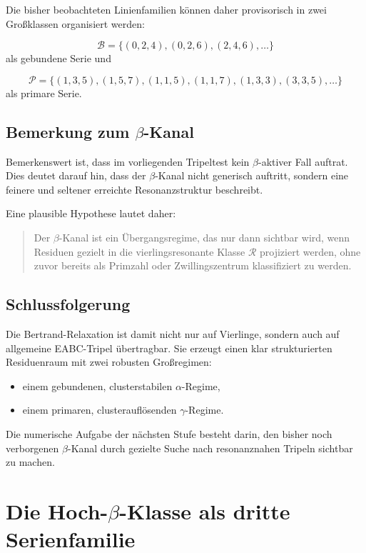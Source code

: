 \documentclass[11pt,a4paper]{article}
\theoremstyle{definition}
\theoremstyle{plain}
\theoremstyle{remark}
\begin{document}
	Die bisher beobachteten Linienfamilien können daher provisorisch in zwei Großklassen organisiert werden:
	
	\[
	\mathcal B
	=
	\{(0,2,4),(0,2,6),(2,4,6),\dots\}
	\]
	als gebundene Serie und
	
	\[
	\mathcal P
	=
	\{(1,3,5),(1,5,7),(1,1,5),(1,1,7),(1,3,3),(3,3,5),\dots\}
	\]
	als primare Serie.
	
	\subsection{Bemerkung zum \texorpdfstring{$\beta$}{beta}-Kanal}
	
	Bemerkenswert ist, dass im vorliegenden Tripeltest kein \(\beta\)-aktiver Fall auftrat. 
	Dies deutet darauf hin, dass der \(\beta\)-Kanal nicht generisch auftritt, sondern eine feinere und seltener erreichte Resonanzstruktur beschreibt.
	
	Eine plausible Hypothese lautet daher:
	
	\begin{quote}
		Der \(\beta\)-Kanal ist ein Übergangsregime, das nur dann sichtbar wird, wenn Residuen gezielt in die vierlingsresonante Klasse \(\mathcal R\) projiziert werden, ohne zuvor bereits als Primzahl oder Zwillingszentrum klassifiziert zu werden.
	\end{quote}
	
	\subsection{Schlussfolgerung}
	
	Die Bertrand-Relaxation ist damit nicht nur auf Vierlinge, sondern auch auf allgemeine EABC-Tripel übertragbar. 
	Sie erzeugt einen klar strukturierten Residuenraum mit zwei robusten Großregimen:
	
	\begin{itemize}
		\item einem gebundenen, clusterstabilen \(\alpha\)-Regime,
		\item einem primaren, clusterauflösenden \(\gamma\)-Regime.
	\end{itemize}
	
	Die numerische Aufgabe der nächsten Stufe besteht darin, den bisher noch verborgenen \(\beta\)-Kanal durch gezielte Suche nach resonanznahen Tripeln sichtbar zu machen.
	\section{Die Hoch-\texorpdfstring{$\beta$}{beta}-Klasse als dritte Serienfamilie}
	
\end{document}
